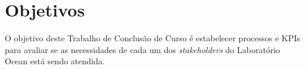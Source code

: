 \section[Objetivos]{Objetivos}
\label{chap:objetivos}

O objetivo deste Trabalho de Conclusão de Curso é estabelecer processos e KPIs para avaliar se as necessidades de cada um dos \textit{stakeholders} do Laboratório Ocean está sendo atendida.
